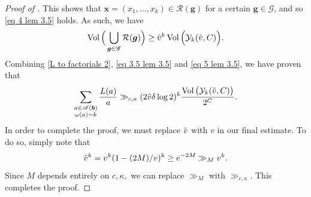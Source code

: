 \documentclass[10pt,a4paper]{amsart}
\DeclareMathOperator{\Vol}{Vol}
\newcommand{\density}{\delta}
\begin{document}
\begin{proof}[Proof of ]
	 This shows that $\bm{x} = (x_1,\dots, x_k) \in \mathcal{R}(\bm{g})$ for a certain $\bm{g} \in \mathscr{G}$, and so \eqref{eq 4 lem 3.5} holds. As such, we have
	\begin{equation}\label{eq 5 lem 3.5}
		\Vol\Big(\bigcup_{\bm{g} \in \mathscr{G}} \mathcal{R}(\bm{g})\Big) \ge \Tilde{v}^k \Vol\Big( \mathcal{Y}_k(\Tilde{v},C)\Big).
	\end{equation}
	Combining \eqref{L to factorials 2}, \eqref{eq 3.5 lem 3.5} and \eqref{eq 5 lem 3.5}, we have proven that
	$$\sum_{\substack{a \in \mathscr{A}(\bm{b}) \\ \omega(a) = k}} \frac{L(a)}{a} \gg_{c,\kappa} (2 \Tilde{v} \density \log 2)^k\frac{\Vol\big( \mathcal{Y}_k(\Tilde{v},C)\big)}{2^C}.$$
	In order to complete the proof, we must replace $\Tilde{v}$ with $v$ in our final estimate. To do so, simply note that 
	$$\Tilde{v}^k = v^k (1-(2M)/v)^k \geq e^{-2M} \gg_M v^k.$$ 
	Since $M$ depends entirely on $c,\kappa,$ we can replace $\gg_M$ with $\gg_{c,\kappa}$. This completes the proof.
\end{proof}
\end{document}
